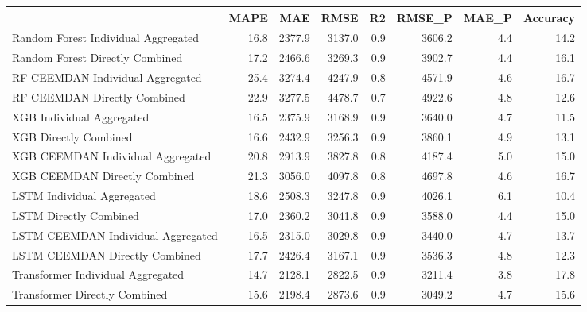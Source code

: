 \begin{tabular}{lrrrrrrr}
\toprule
{} &  MAPE &    MAE &   RMSE &  R2 &  RMSE\_P &  MAE\_P &  Accuracy \\
\midrule
Random Forest Individual Aggregated &  16.8 & 2377.9 & 3137.0 & 0.9 &  3606.2 &    4.4 &      14.2 \\
Random Forest Directly Combined     &  17.2 & 2466.6 & 3269.3 & 0.9 &  3902.7 &    4.4 &      16.1 \\
RF CEEMDAN Individual Aggregated    &  25.4 & 3274.4 & 4247.9 & 0.8 &  4571.9 &    4.6 &      16.7 \\
RF CEEMDAN Directly Combined        &  22.9 & 3277.5 & 4478.7 & 0.7 &  4922.6 &    4.8 &      12.6 \\
XGB Individual Aggregated           &  16.5 & 2375.9 & 3168.9 & 0.9 &  3640.0 &    4.7 &      11.5 \\
XGB Directly Combined               &  16.6 & 2432.9 & 3256.3 & 0.9 &  3860.1 &    4.9 &      13.1 \\
XGB CEEMDAN Individual Aggregated   &  20.8 & 2913.9 & 3827.8 & 0.8 &  4187.4 &    5.0 &      15.0 \\
XGB CEEMDAN Directly Combined       &  21.3 & 3056.0 & 4097.8 & 0.8 &  4697.8 &    4.6 &      16.7 \\
LSTM Individual Aggregated          &  18.6 & 2508.3 & 3247.8 & 0.9 &  4026.1 &    6.1 &      10.4 \\
LSTM Directly Combined              &  17.0 & 2360.2 & 3041.8 & 0.9 &  3588.0 &    4.4 &      15.0 \\
LSTM CEEMDAN Individual Aggregated  &  16.5 & 2315.0 & 3029.8 & 0.9 &  3440.0 &    4.7 &      13.7 \\
LSTM CEEMDAN Directly Combined      &  17.7 & 2426.4 & 3167.1 & 0.9 &  3536.3 &    4.8 &      12.3 \\
Transformer Individual Aggregated   &  14.7 & 2128.1 & 2822.5 & 0.9 &  3211.4 &    3.8 &      17.8 \\
Transformer Directly Combined       &  15.6 & 2198.4 & 2873.6 & 0.9 &  3049.2 &    4.7 &      15.6 \\
\bottomrule
\end{tabular}
